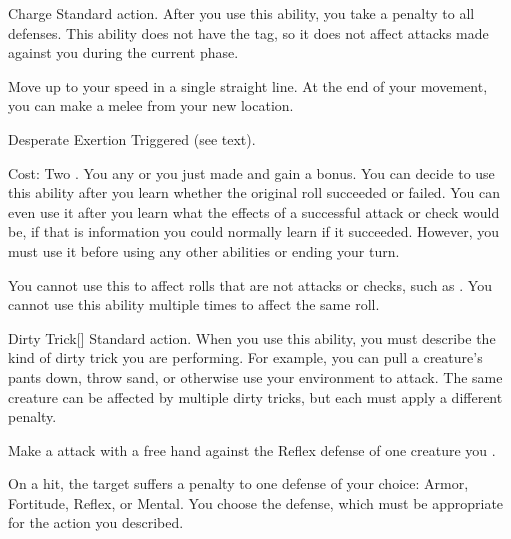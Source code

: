         \begin{activeability}{Charge}
            \label{Charge}
            \abilityusagetime Standard action.
            \rankline
            After you use this ability, you  take a  penalty to all defenses.
            This ability does not have the  tag, so it does not affect attacks made against you during the current phase.

            Move up to your speed in a single straight line.
            At the end of your movement, you can make a melee  from your new location.
        \end{activeability}

        \begin{activeability}{Desperate Exertion}
            \label{Desperate Exertion}
            \abilityusagetime Triggered (see text).
            \par \noindent Cost: Two .
            \rankline
            You  any  or  you just made and gain a  bonus.
            You can decide to use this ability after you learn whether the original roll succeeded or failed.
            You can even use it after you learn what the effects of a successful attack or check would be, if that is information you could normally learn if it succeeded.
            However, you must use it before using any other abilities or ending your turn.

            You cannot use this to affect rolls that are not attacks or checks, such as .
            You cannot use this ability multiple times to affect the same roll.
        \end{activeability}

        \begin{activeability}{Dirty Trick}[]
            \label{Dirty Trick}
            \abilityusagetime Standard action.
            \rankline
            When you use this ability, you must describe the kind of dirty trick you are performing.
            For example, you can pull a creature's pants down, throw sand, or otherwise use your environment to attack.
            The same creature can be affected by multiple dirty tricks, but each must apply a different penalty.

            Make a attack with a free hand against the Reflex defense of one creature you .

            On a hit, the target  suffers a  penalty to one defense of your choice: Armor, Fortitude, Reflex, or Mental.
            You choose the defense, which must be appropriate for the action you described.
        \end{activeability}

